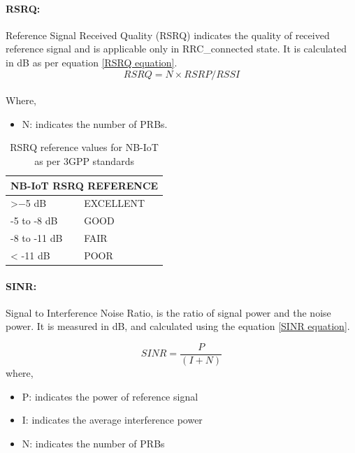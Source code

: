 \documentclass[12pt]{article}
\begin{document}
\paragraph{RSRQ:}
Reference Signal Received Quality (RSRQ) indicates the quality of received reference signal and is applicable only in RRC\_connected state. It is calculated in dB as per equation \ref{RSRQ equation}. 
\begin{equation}
     RSRQ= {{N\times} RSRP/ RSSI}
     \label{RSRQ equation}
\end{equation}
\\ Where,
\begin{itemize}
    \item N: indicates the number of PRBs.
\end{itemize}

\begin{table}[!h]
\caption {RSRQ reference values for NB-IoT as per 3GPP standards\cite{3GPP,sikora2019performance}}
\centering

\begin{tabular}{|p{5cm}|p{5cm}|}
\hline
\multicolumn{2}{|c|}{NB-IoT RSRQ REFERENCE} \\ \hline
>−5 dB                 & EXCELLENT          \\ \hline
-5 to -8 dB            & GOOD               \\ \hline
-8 to -11 dB           & FAIR               \\ \hline
< -11 dB               & POOR               \\ \hline
\end{tabular}

\label{nbiotRSRQ}
\end{table}

\paragraph{SINR:} Signal to Interference Noise Ratio, is the ratio of signal power and the noise power. It is measured in dB, and calculated using the equation \ref{SINR equation}. \par

\begin{equation}
       SINR={\dfrac{P}{(I+N)}}
     \label{SINR equation}
\end{equation}
where, 
\begin{itemize}
    \item P: indicates the power of reference signal
    \item I: indicates the average interference power
    \item N: indicates the number of PRBs
\end{itemize}
\end{document}
